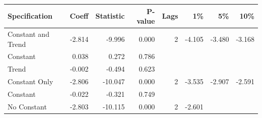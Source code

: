 \begin{table}[htbp]
\centering
{}
\label{tab:adf_ocean_temp}
\small
\begin{tabular}{lrrrrrrr}
\toprule
\textbf{Specification} & \textbf{Coeff} & \textbf{Statistic} & \textbf{P-value} & \textbf{Lags} & \textbf{1\%} & \textbf{5\%} & \textbf{10\%} \\
\midrule
Constant and Trend & -2.814 & -9.996 & 0.000 & 2 & -4.105 & -3.480 & -3.168 \\
\quad Constant & 0.038 & 0.272 & 0.786 & & & & \\
\quad Trend & -0.002 & -0.494 & 0.623 & & & & \\
Constant Only & -2.806 & -10.047 & 0.000 & 2 & -3.535 & -2.907 & -2.591 \\
\quad Constant & -0.022 & -0.321 & 0.749 & & & & \\
No Constant & -2.803 & -10.115 & 0.000 & 2 & -2.601 & & \\
\bottomrule
\end{tabular}
\end{table}

